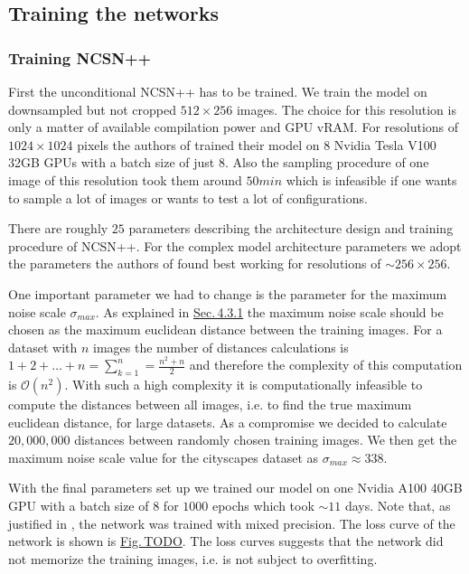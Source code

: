 \subsection{Training the networks} \label{sec:5.4.3}
\subsubsection{Training NCSN++}
First the unconditional NCSN++ has to be trained. We train the model on downsampled but not cropped $512\times256$ images. The choice for this resolution is only a matter of available compilation power and GPU vRAM. For resolutions of $1024\times1024$ pixels the authors of \cite{score_3} trained their model on $8$ Nvidia Tesla V100 32GB GPUs with a batch size of just $8$. Also the sampling procedure of one image of this resolution took them around $50min$ which is infeasible if one wants to sample a lot of images or wants to test a lot of configurations. 

There are roughly $25$ parameters describing the architecture design and training procedure of NCSN++. For the complex model architecture parameters we adopt the parameters the authors of \cite{score_3} found best working for resolutions of $\sim256\times256$. 

One important parameter we had to change is the parameter for the maximum noise scale $\sigma_{max}$. As explained in \hyperref[sec:4.3.1]{Sec.\,4.3.1} the maximum noise scale should be chosen as the maximum euclidean distance between the training images. For a dataset with $n$ images the number of distances calculations is $1+2+\dots+n=\sum_{k=1}^n=\frac{n^2+n}{2}$ and therefore the complexity of this computation is $\mathcal{O}(n^2)$. With such a high complexity it is computationally infeasible to compute the distances between all images, i.e. to find the true maximum euclidean distance, for large datasets. As a compromise we decided to calculate $20{,}000{,}000$ distances between randomly chosen training images. We then get the maximum noise scale value for the cityscapes dataset as $\sigma_{max}\approx338$.

With the final parameters set up we trained our model on one Nvidia A100 40GB GPU with a batch size of $8$ for $1000$ epochs which took $\sim11$ days. Note that, as justified in \hyperref[sec:5.3.1], the network was trained with mixed precision. The loss curve of the network is shown is \hyperref[fig:]{Fig.\,TODO}. The loss curves suggests that the network did not memorize the training images, i.e. is not subject to overfitting.

